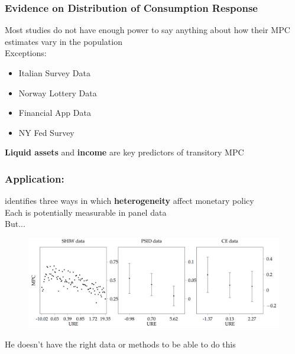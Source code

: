 \documentclass{beamer}
\begin{document}
\frame
{
	\frametitle{Evidence on Distribution of Consumption Response}
	Most studies do not have enough power to say anything about how their MPC estimates vary in the population\\
	\bigskip
	Exceptions:
	\begin{itemize}
		\item \cite{jappelli_fiscal_2014} Italian Survey Data
		\item \cite{fagereng_mpc_2016} Norway Lottery Data
		\item \cite{gelman_what_2016} Financial App Data
		\item \cite{fuster_what_2018} NY Fed Survey
	\end{itemize}
	\bigskip
	\textbf{Liquid assets} and \textbf{income} are key predictors of transitory MPC
}

\frame
{
	\frametitle{Application: \cite{auclert_monetary_2017}}
	\cite{auclert_monetary_2017} identifies three ways in which \textbf{heterogeneity} affect monetary policy\\
	Each is potentially measurable in panel data\\
	But...\\
	\pause
	\begin{figure}
		\includegraphics[scale=0.6]{../Figures/MPCDistributionAuclert}
	\end{figure}
	He doesn't have the right data or methods to be able to do this
}
\end{document}
